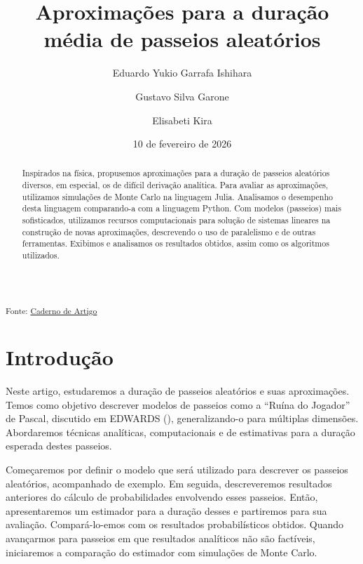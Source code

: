\documentclass[
  brazilian,
  12pt,
]{article}
\title{Aproximações para a duração média de passeios aleatórios}
\author{Eduardo Yukio Garrafa Ishihara \and Gustavo Silva
Garone \and Elisabeti Kira}
\date{10 de fevereiro de 2026}
\theoremstyle{definition}
\theoremstyle{definition}
\theoremstyle{remark}
\begin{document}
\maketitle
\begin{abstract}
Inspirados na física, propusemos aproximações para a duração de passeios
aleatórios diversos, em especial, os de difícil derivação analítica.
Para avaliar as aproximações, utilizamos simulações de Monte Carlo na
linguagem Julia. Analisamos o desempenho desta linguagem comparando-a
com a linguagem Python. Com modelos (passeios) mais sofisticados,
utilizamos recursos computacionais para solução de sistemas lineares na
construção de novas aproximações, descrevendo o uso de paralelismo e de
outras ferramentas. Exibimos e analisamos os resultados obtidos, assim
como os algoritmos utilizados.
\end{abstract}

\renewcommand{\Return}{\State \textbf{return}~}
\newcommand{\Print}{\State \textbf{print}~}
\newcommand{\Break}{\State \textbf{break}}
\newcommand{\Continue}{\State \textbf{continue}}
\newcommand{\True}{\textbf{true}}
\newcommand{\False}{\textbf{false}}
\renewcommand{\And}{\textbf{and}~}
\newcommand{\Or}{\textbf{or}~}
\renewcommand{\Not}{\textbf{not}~}
\newcommand{\To}{\textbf{to}~}
\newcommand{\DownTo}{\textbf{downto}~}



\textsubscript{Fonte:
\href{https://GustavoGarone.github.io/Estimador-de-Passeio/Estimando_Passeios_Aleatorios.qmd.html}{Caderno
de Artigo}}

\section{Introdução}\label{introduuxe7uxe3o}

Neste artigo, estudaremos a duração de passeios aleatórios e suas
aproximações. Temos como objetivo descrever modelos de passeios como a
``Ruína do Jogador'' de Pascal, discutido em EDWARDS
(), generalizando-o para
múltiplas dimensões. Abordaremos técnicas analíticas, computacionais e
de estimativas para a duração esperada destes passeios.

Começaremos por definir o modelo que será utilizado para descrever os
passeios aleatórios, acompanhado de exemplo. Em seguida, descreveremos
resultados anteriores do cálculo de probabilidades envolvendo esses
passeios. Então, apresentaremos um estimador para a duração desses e
partiremos para sua avaliação. Compará-lo-emos com os resultados
probabilísticos obtidos. Quando avançarmos para passeios em que
resultados analíticos não são factíveis, iniciaremos a comparação do
estimador com simulações de Monte Carlo.
\end{document}
